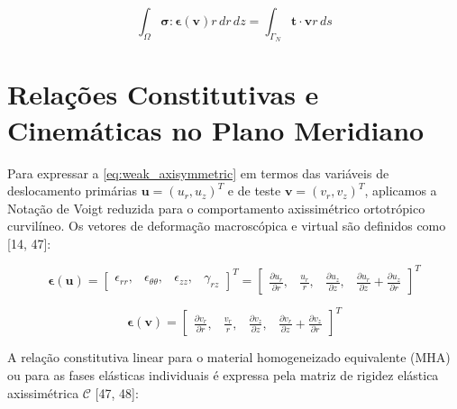 \begin{equation}
  \int_{\Omega} \mathbf{\sigma} : \mathbf{\epsilon}(\mathbf{v}) r \, d r \, d z = \int_{\Gamma_N} \mathbf{t} \cdot \mathbf{v} r \, d s
  \label{eq:weak_axisymmetric}
\end{equation}

\section{Relações Constitutivas e Cinemáticas no Plano Meridiano}

Para expressar a \eqref{eq:weak_axisymmetric} em termos das variáveis de deslocamento primárias $\mathbf{u} = (u_r, u_z)^T$ e de teste $\mathbf{v} = (v_r, v_z)^T$, aplicamos a Notação de Voigt reduzida para o comportamento axissimétrico ortotrópico curvilíneo. Os vetores de deformação macroscópica e virtual são definidos como [14, 47]:

\begin{equation}
  \mathbf{\epsilon}(\mathbf{u}) = \begin{bmatrix} \epsilon_{rr}, & \epsilon_{\theta\theta}, & \epsilon_{zz}, & \gamma_{rz} \end{bmatrix}^T = \begin{bmatrix} \frac{\partial u_r}{\partial r}, & \frac{u_r}{r}, & \frac{\partial u_z}{\partial z}, & \frac{\partial u_r}{\partial z} + \frac{\partial u_z}{\partial r} \end{bmatrix}^T
  \label{eq:voigt_strain}
\end{equation}

\begin{equation}
  \mathbf{\epsilon}(\mathbf{v}) = \begin{bmatrix} \frac{\partial v_r}{\partial r}, & \frac{v_r}{r}, & \frac{\partial v_z}{\partial z}, & \frac{\partial v_r}{\partial z} + \frac{\partial v_z}{\partial r} \end{bmatrix}^T
  \label{eq:voigt_virtual_strain}
\end{equation}

A relação constitutiva linear para o material homogeneizado equivalente (MHA) ou para as fases elásticas individuais é expressa pela matriz de rigidez elástica axissimétrica $\mathbf{\mathcal{C}}$ [47, 48]:

